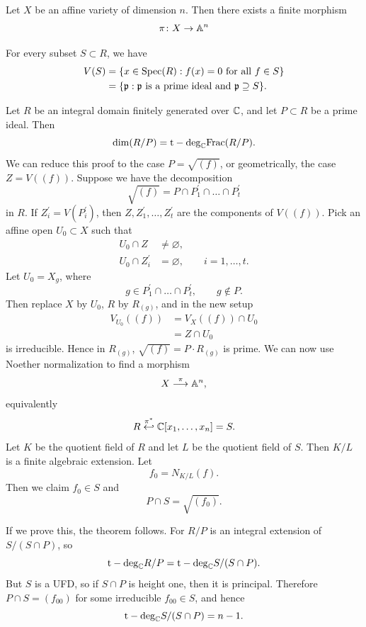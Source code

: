 \begin{theorem*}{
    Let $X$ be an affine variety of dimension $n$.
    Then there exists a finite morphism
    \[
        \pi \colon X \to \aa^{n}
    \]
}
\end{theorem*}

\begin{definition}[$V(S)$]
For every subset $S\subset R$, we have
\begin{align*}
V(S) &= \{x\in\spec(R) : f(x) = 0 \text{ for all } f\in S\} \\
&= \{\mathfrak{p} : \mathfrak{p} \text{ is a prime ideal and } \mathfrak{p}\supseteq S\}.
\end{align*}
\end{definition}

\begin{theorem}{
Let $R$ be an integral domain finitely generated over $\c$, and let $P\subset R$ be a prime ideal.
Then
\[
\dim(R/P) = \tdeg_{\c}\Frac(R/P).
\]
}
We can reduce this proof to the case $P = \sqrt{(f)}$, or geometrically, the case $Z = V((f))$.
Suppose we have the decomposition
\[
\sqrt{(f)} = P\cap P_1^{\prime}\cap\ldots\cap P_t^{\prime}
\]
in $R$.
If $Z_i^{\prime} = V(P_i^{\prime})$, then $Z,Z_1^{\prime},\ldots,Z_t^{\prime}$ are the components of $V((f))$.
Pick an affine open $U_0\subset X$ such that
\begin{align*}
U_0\cap Z &\neq \varnothing,\\
U_0\cap Z_i^{\prime} &= \varnothing,\qquad i = 1,\ldots,t.
\end{align*}
Let $U_0 = X_g$, where
\[
g\in P_1^{\prime}\cap\ldots\cap P_t^{\prime},\qquad g\notin P.
\]
Then replace $X$ by $U_0$, $R$ by $R_{(g)}$, and in the new setup
\begin{align*}
V_{U_0}((f)) &= V_X((f))\cap U_0 \\
&= Z\cap U_0
\end{align*}
is irreducible.
Hence in $R_{(g)}$, $\sqrt{(f)} = P\cdot R_{(g)}$ is prime.
We can now use Noether normalization to find a morphism
\[
X\overset{\pi}{\longrightarrow}\aa^n,
\]
equivalently
\[
R\overset{\pi^\ast}{\hookleftarrow} \c[x_1,\ldots,x_n] = S.
\]
Let $K$ be the quotient field of $R$ and let $L$ be the quotient field of $S$.
Then $K/L$ is a finite algebraic extension.
Let
\[
f_0 = N_{K/L}(f).
\]
Then we claim $f_0\in S$ and
\[
P\cap S = \sqrt{(f_0)}.
\]

If we prove this, the theorem follows.
For $R/P$ is an integral extension of $S/(S\cap P)$, so
\[
\tdeg_{\c} R/P = \tdeg_{\c} S/(S\cap P).
\]
But $S$ is a UFD, so if $S\cap P$ is height one, then it is principal.
Therefore $P\cap S = (f_{00})$ for some irreducible $f_{00}\in S$, and hence
\[
\tdeg_{\c} S/(S\cap P) = n-1.
\]


\end{theorem}
